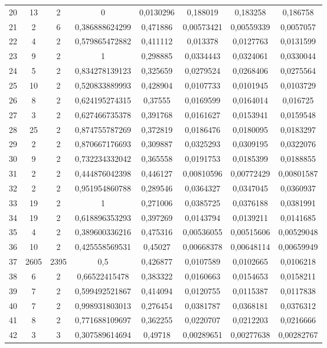 \begin{longtable}{|c|c|c|c|c|c|c|c|}
20 & 13 & 2 & 0 & 0,0130296 & 0,188019 & 0,183258 & 0,186758  \\
21 & 2 & 6 & 0,386888624299 & 0,471886 & 0,00573421 & 0,00559339 & 0,0057057  \\
22 & 4 & 2 & 0,579865472882 & 0,411112 & 0,013378 & 0,0127763 & 0,0131599  \\
23 & 9 & 2 & 1 & 0,298885 & 0,0334443 & 0,0324061 & 0,0330044  \\
24 & 5 & 2 & 0,834278139123 & 0,325659 & 0,0279524 & 0,0268406 & 0,0275564  \\
25 & 10 & 2 & 0,520833889993 & 0,428904 & 0,0107733 & 0,0101945 & 0,0103729  \\
26 & 8 & 2 & 0,624195274315 & 0,37555 & 0,0169599 & 0,0164014 & 0,016725  \\
27 & 3 & 2 & 0,627466735378 & 0,391768 & 0,0161627 & 0,0153941 & 0,0159548  \\
28 & 25 & 2 & 0,874755787269 & 0,372819 & 0,0186476 & 0,0180095 & 0,0183297  \\
29 & 2 & 2 & 0,870667176693 & 0,309887 & 0,0325293 & 0,0309195 & 0,0322076  \\
30 & 9 & 2 & 0,732234332042 & 0,365558 & 0,0191753 & 0,0185399 & 0,0188855  \\
31 & 2 & 2 & 0,444876042398 & 0,446127 & 0,00810596 & 0,00772429 & 0,00801587  \\
32 & 2 & 2 & 0,951954860788 & 0,289546 & 0,0364327 & 0,0347045 & 0,0360937  \\
33 & 19 & 2 & 1 & 0,271006 & 0,0385725 & 0,0376188 & 0,0381991  \\
34 & 19 & 2 & 0,618896353293 & 0,397269 & 0,0143794 & 0,0139211 & 0,0141685  \\
35 & 4 & 2 & 0,389600336216 & 0,475316 & 0,00536055 & 0,00515606 & 0,00529048  \\
36 & 10 & 2 & 0,425558569531 & 0,45027 & 0,00668378 & 0,00648114 & 0,00659949  \\
37 & 2605 & 2395 & 0,5 & 0,426877 & 0,0107589 & 0,0102665 & 0,0106218  \\
38 & 6 & 2 & 0,66522415478 & 0,383322 & 0,0160663 & 0,0154653 & 0,0158211  \\
39 & 7 & 2 & 0,599492521867 & 0,414094 & 0,0120755 & 0,0115387 & 0,0117838  \\
40 & 7 & 2 & 0,998931803013 & 0,276454 & 0,0381787 & 0,0368181 & 0,0376312  \\
41 & 8 & 2 & 0,771688109697 & 0,362255 & 0,0220707 & 0,0212203 & 0,0216666  \\
42 & 3 & 3 & 0,307589614694 & 0,49718 & 0,00289651 & 0,00277638 & 0,00282767  \\

\end{longtable}
